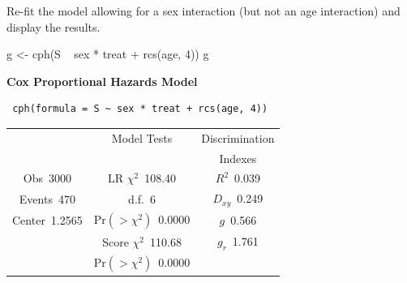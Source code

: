 Re-fit the model allowing for a sex interaction (but not an age interaction) and display the results.
\begin{Sinput}
g <- cph(S ~ sex * treat + rcs(age, 4))
g
\end{Sinput}

 \centerline{\textbf{Cox Proportional Hazards Model}}
 
 \begin{verbatim}
 cph(formula = S ~ sex * treat + rcs(age, 4))
 \end{verbatim}
 
 {\selectfont \begin{center}\begin{tabular}{|c|c|c|}\hline
&Model Tests&Discrimination\\
&&Indexes\\\hline
Obs~\hfill 3000&LR $\chi^{2}$~\hfill 108.40&$R^{2}$~\hfill 0.039\\
Events~\hfill 470&d.f.~\hfill 6&$D_{xy}$~\hfill 0.249\\
Center~\hfill 1.2565&Pr$(>\chi^{2})$~\hfill 0.0000&$g$~\hfill 0.566\\
&Score $\chi^{2}$~\hfill 110.68&$g_{r}$~\hfill 1.761\\
&Pr$(>\chi^{2})$~\hfill 0.0000&\\
\hline
\end{tabular}
\end{center}}
 
